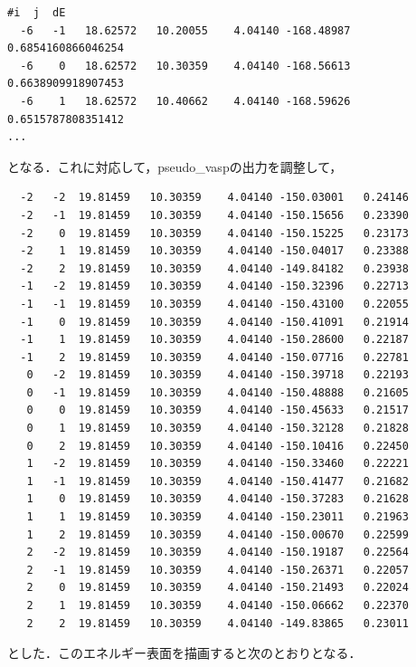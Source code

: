 \begin{verbatim}
#i  j  dE  
  -6   -1   18.62572   10.20055    4.04140 -168.48987 0.6854160866046254
  -6    0   18.62572   10.30359    4.04140 -168.56613 0.6638909918907453
  -6    1   18.62572   10.40662    4.04140 -168.59626 0.6515787808351412
...
\end{verbatim}

となる．これに対応して，pseudo\_vaspの出力を調整して，

\begin{verbatim}
  -2   -2  19.81459   10.30359    4.04140 -150.03001   0.24146     
  -2   -1  19.81459   10.30359    4.04140 -150.15656   0.23390     
  -2    0  19.81459   10.30359    4.04140 -150.15225   0.23173     
  -2    1  19.81459   10.30359    4.04140 -150.04017   0.23388     
  -2    2  19.81459   10.30359    4.04140 -149.84182   0.23938     
  -1   -2  19.81459   10.30359    4.04140 -150.32396   0.22713     
  -1   -1  19.81459   10.30359    4.04140 -150.43100   0.22055     
  -1    0  19.81459   10.30359    4.04140 -150.41091   0.21914     
  -1    1  19.81459   10.30359    4.04140 -150.28600   0.22187     
  -1    2  19.81459   10.30359    4.04140 -150.07716   0.22781     
   0   -2  19.81459   10.30359    4.04140 -150.39718   0.22193     
   0   -1  19.81459   10.30359    4.04140 -150.48888   0.21605     
   0    0  19.81459   10.30359    4.04140 -150.45633   0.21517     
   0    1  19.81459   10.30359    4.04140 -150.32128   0.21828     
   0    2  19.81459   10.30359    4.04140 -150.10416   0.22450     
   1   -2  19.81459   10.30359    4.04140 -150.33460   0.22221     
   1   -1  19.81459   10.30359    4.04140 -150.41477   0.21682     
   1    0  19.81459   10.30359    4.04140 -150.37283   0.21628     
   1    1  19.81459   10.30359    4.04140 -150.23011   0.21963     
   1    2  19.81459   10.30359    4.04140 -150.00670   0.22599     
   2   -2  19.81459   10.30359    4.04140 -150.19187   0.22564     
   2   -1  19.81459   10.30359    4.04140 -150.26371   0.22057     
   2    0  19.81459   10.30359    4.04140 -150.21493   0.22024     
   2    1  19.81459   10.30359    4.04140 -150.06662   0.22370     
   2    2  19.81459   10.30359    4.04140 -149.83865   0.23011
\end{verbatim}

とした．このエネルギー表面を描画すると次のとおりとなる．

